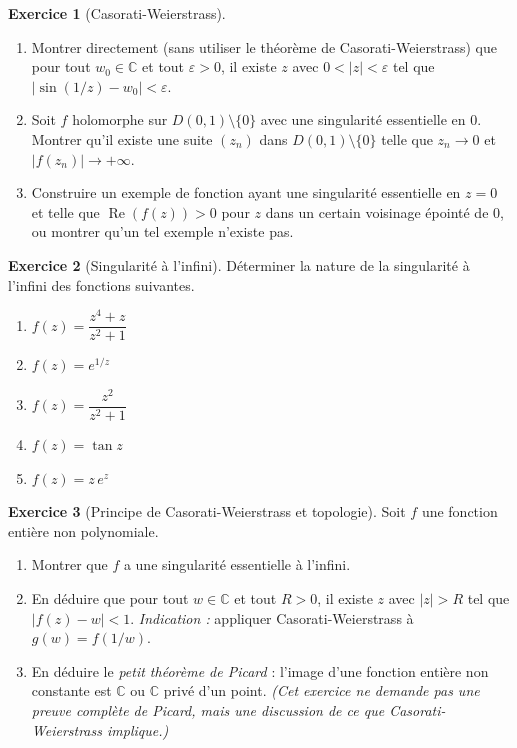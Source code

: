 \documentclass[12pt,a4paper,openany]{book}
\theoremstyle{definition}
\newtheorem{exercice}{Exercice}[chapter]
\theoremstyle{plain}
\theoremstyle{remark}
\newcommand{\C}{\mathbb{C}}
\DeclareMathOperator{\re}{Re}
\newcommand{\abs}[1]{\left|#1\right|}
\begin{document}
\begin{exercice}[Casorati-Weierstrass]\label{exo:casorati}
\begin{enumerate}[label=\textbf{\alph*)}]
  \item Montrer directement (sans utiliser le théorème de
        Casorati-Weierstrass) que pour tout $w_0 \in \C$ et tout
        $\varepsilon > 0$, il existe $z$ avec $0 < \abs{z} < \varepsilon$
        tel que $\abs{\sin(1/z) - w_0} < \varepsilon$.
  \item Soit $f$ holomorphe sur $D(0,1)\setminus\{0\}$ avec une
        singularité essentielle en $0$. Montrer qu'il existe une suite
        $(z_n)$ dans $D(0,1)\setminus\{0\}$ telle que $z_n \to 0$
        et $\abs{f(z_n)} \to +\infty$.
  \item Construire un exemple de fonction ayant une singularité
        essentielle en $z = 0$ et telle que $\re(f(z)) > 0$ pour
        $z$ dans un certain voisinage épointé de $0$, ou montrer
        qu'un tel exemple n'existe pas.
\end{enumerate}
\end{exercice}

\begin{exercice}[Singularité à l'infini]\label{exo:sing-infty}
Déterminer la nature de la singularité à l'infini des fonctions suivantes.
\begin{enumerate}[label=\textbf{\alph*)}]
  \item $f(z) = \dfrac{z^4 + z}{z^2 + 1}$
  \item $f(z) = e^{1/z}$
  \item $f(z) = \dfrac{z^2}{z^2+1}$
  \item $f(z) = \tan z$
  \item $f(z) = z\,e^z$
\end{enumerate}
\end{exercice}

\begin{exercice}[Principe de Casorati-Weierstrass et topologie]\label{exo:casorati-topo}
Soit $f$ une fonction entière non polynomiale.
\begin{enumerate}[label=\textbf{\alph*)}]
  \item Montrer que $f$ a une singularité essentielle à l'infini.
  \item En déduire que pour tout $w \in \C$ et tout $R > 0$, il existe
        $z$ avec $\abs{z} > R$ tel que $\abs{f(z) - w} < 1$.
        \emph{Indication :} appliquer Casorati-Weierstrass à $g(w) = f(1/w)$.
  \item En déduire le \emph{petit théorème de Picard} : l'image d'une
        fonction entière non constante est $\C$ ou $\C$ privé d'un point.
        \emph{(Cet exercice ne demande pas une preuve complète de Picard,
        mais une discussion de ce que Casorati-Weierstrass implique.)}
\end{enumerate}
\end{exercice}
\end{document}
